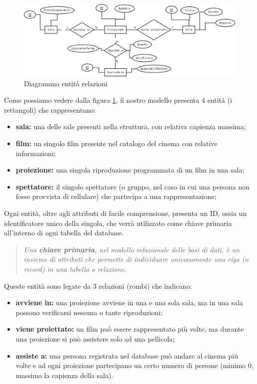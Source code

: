 \documentclass{article}
\begin{document}
\begin{figure}[h]
    \centering
    \includegraphics[width=\textwidth]{ERElaborato.png}
    \caption{Diagramma entità relazioni}
    \label{fig:ER}
\end{figure}

Come possiamo vedere dalla figura \ref{fig:ER}, il nostro modello presenta 4 entità (i rettangoli) che rappresentano: 
\begin{itemize}
    \item \textbf{sala: }una delle sale presenti nella struttura, con relativa capienza massima;
    \item \textbf{film: }un singolo film presente nel catalogo del cinema con relative informazioni;
    \item \textbf{proiezione: }una singola riproduzione programmata di un film in una sala;
    \item \textbf{spettatore: }il singolo spettatore (o gruppo, nel caso in cui una persona non fosse provvista di cellulare) che partecipa a una rappresentazione;
\end{itemize}
Ogni entità, oltre agli attributi di facile comprensione, presenta un ID, ossia un identificatore unico della singola, che verrà utilizzato come chiave primaria all'interno di ogni tabella del database.
\begin{quote}
\begin{Cit}
\textit{
Una \textbf{chiave primaria}, nel modello relazionale delle basi di dati, è un insieme di attributi che permette di individuare univocamente una riga (o record) in una tabella o relazione.}
\end{Cit}
\end{quote}

Queste entità sono legate da 3 relazioni (rombi) che indicano:
\begin{itemize}
    \item \textbf{avviene in: }una proiezione avviene in una e una sola sala, ma in una sala possono verificarsi nessuna o tante riproduzioni;
    \item \textbf{viene proiettato: }un film può essere rappresentato più volte, ma durante una proiezione si può assistere solo ad una pellicola;
    \item \textbf{assiste a: }una persona registrata nel database può andare al cinema più volte e ad ogni proiezione partecipano un certo numero di persone (minimo 0, massimo la capienza della sala).
\end{itemize}
\end{document}
